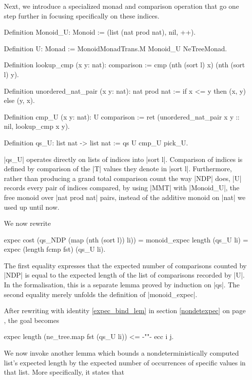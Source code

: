 \documentclass[runningheads]{llncs}
\begin{document}
Next, we introduce a specialized monad and comparison operation that go one step further in focusing specifically on these indices.
\begin{code}
  Definition Monoid_U: Monoid := (list (nat prod nat), nil, ++).

  Definition U: Monad := MonoidMonadTrans.M Monoid_U NeTreeMonad.

  Definition lookup_cmp (x y: nat): comparison :=
    cmp (nth (sort l) x) (nth (sort l) y).

  Definition unordered_nat_pair (x y: nat): nat prod nat :=
    if x <= y then (x, y) else (y, x).

  Definition cmp_U (x y: nat): U comparison :=
    ret (unordered_nat_pair x y :: nil, lookup_cmp x y).

  Definition qs_U: list nat -> list nat := qs U cmp_U pick_U.
\end{code}
|qs_U| operates directly on lists of indices into |sort l|. Comparison of indices is defined by comparison of the |T| values they denote in |sort l|. Furthermore, rather than producing a grand total comparison count the way |NDP| does, |U| records every pair of indices compared, by using |MMT| with |Monoid_U|, the free monoid over |nat prod nat| pairs, instead of the additive monoid on |nat| we used up until now.

We now rewrite
\begin{code}expec cost (qs_NDP (map (nth (sort l)) li))
  = monoid_expec length (qs_U li) = expec (length fcmp fst) (qs_U li).
\end{code}
The first equality expresses that the expected number of comparisons counted by |NDP| is equal to the expected length of the list of comparisons recorded by |U|. In the formalisation, this is a separate lemma proved by induction on |qs|. The second equality merely unfolds the definition of |monoid_expec|.

After rewriting with identity \ref{expec_bind_lem} in section \ref{nondetexpec} on page \pageref{expec_bind_lem}, the goal becomes
\begin{code}
  expec length (ne_tree.map fst (qs_U li)) <= {-""-} ecc i j.
\end{code}
We now invoke another lemma which bounds a nondeterministically computed list's expected length by the expected number of occurrences of specific values in that list. More specifically, it states that
\end{document}
